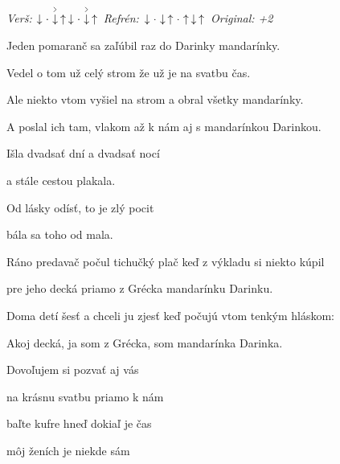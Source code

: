 \begin{song}


 \quad
\textit{Verš:} $\Down\Miss\AccentDown\Up\Down\Miss\AccentDown\Up$ \quad
\textit{Refrén:} $\Down\Miss\Down\Up\Miss\Up\Down\Up$ \quad
\textit{Original: +2}

\large


\Large

\bigskip

Jeden pomaranč sa zaľúbil raz do Darinky mandarínky.\par
{}Vedel o tom už celý strom že už je na svatbu čas.\par
{}Ale niekto vtom vyšiel na strom a obral všetky mandarínky.\par
A poslal ich tam, vlakom až k nám aj s mandarínkou Darinkou.\par

\bigskip

Išla dvadsať dní a dvadsať nocí\par
a stále cestou plakala.\par
{}Od lásky odísť, to je zlý pocit\par
{}bála sa toho od mala. \par

\bigskip

Ráno predavač počul tichučký plač keď z výkladu si niekto kúpil\par
pre jeho decká priamo z Grécka mandarínku Darinku.\par
{}Doma detí šesť a chceli ju zjesť keď počujú vtom tenkým hláskom:\par
{}Akoj decká, ja som z Grécka, som mandarínka Darinka.\par

\bigskip

Dovoľujem si pozvať aj vás\par
na krásnu svatbu priamo k nám\par
{}baľte kufre hneď dokiaľ je čas\par
{}môj ženích je niekde sám \par


\end{song}
